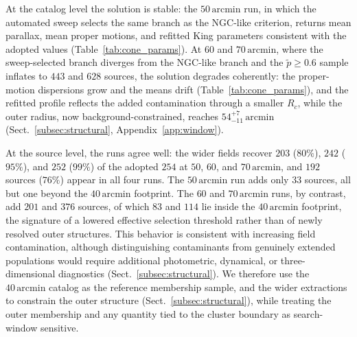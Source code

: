 \documentclass{aa}
\begin{document}
At the catalog level the solution is stable: the $50\,\mathrm{arcmin}$ run, in which the automated sweep selects the same branch as the NGC-like criterion, returns mean parallax, mean proper motions, and refitted King parameters consistent with the adopted values (Table~\ref{tab:cone_params}). At $60$ and $70\,\mathrm{arcmin}$, where the sweep-selected branch diverges from the NGC-like branch and the $\tilde{p}\geq0.6$ sample inflates to $443$ and $628$ sources, the solution degrades coherently: the proper-motion dispersions grow and the means drift (Table~\ref{tab:cone_params}), and the refitted profile reflects the added contamination through a smaller $R_c$, while the outer radius, now background-constrained, reaches $54^{+7}_{-11}\,\mathrm{arcmin}$ (Sect.~\ref{subsec:structural}, Appendix~\ref{app:window}).

At the source level, the runs agree well: the wider fields recover $203$ ($80\%$), $242$ ($95\%$), and $252$ ($99\%$) of the adopted $254$ at $50$, $60$, and $70\,\mathrm{arcmin}$, and $192$ sources ($76\%$) appear in all four runs. The $50\,\mathrm{arcmin}$ run adds only $33$ sources, all but one beyond the $40\,\mathrm{arcmin}$ footprint. The $60$ and $70\,\mathrm{arcmin}$ runs, by contrast, add $201$ and $376$ sources, of which $83$ and $114$ lie inside the $40\,\mathrm{arcmin}$ footprint, the signature of a lowered effective selection threshold rather than of newly resolved outer structures. This behavior is consistent with increasing field contamination, although distinguishing contaminants from genuinely extended populations would require additional photometric, dynamical, or three-dimensional diagnostics (Sect.~\ref{subsec:structural}). We therefore use the $40\,\mathrm{arcmin}$ catalog as the reference membership sample, and the wider extractions to constrain the outer structure (Sect.~\ref{subsec:structural}), while treating the outer membership and any quantity tied to the cluster boundary as search-window sensitive.
\end{document}
